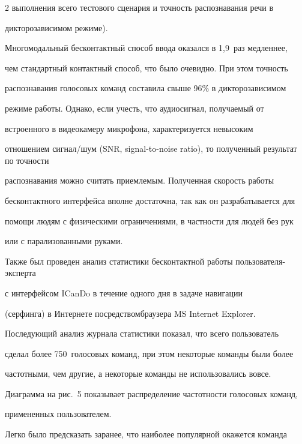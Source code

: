 \begin{multicols}{2}
выполнения всего тестового сценария и точность распознавания речи в 


дикторозависимом режиме). 


    





  Многомодальный бесконтактный способ ввода оказался в 1,9~раз медленнее, 


чем стандартный контактный способ, что было очевидно. При этом точность 


распознавания голосовых команд составила свыше 96\% в дикторозависимом 


режиме работы. Однако, если учесть, что аудиосигнал, по\-лу\-ча\-емый от 


встроенного в видеокамеру микрофона, характеризуется невысоким 


отношением сигнал/шум (SNR, signal-to-noise ratio), то полученный результат по точности 


распознавания можно считать приемлемым. Полученная скорость работы 


бесконтактного интерфейса вполне достаточна, так как он разрабатывается для 


помощи людям с физическими ограничениями, в частности для людей без рук 


или с парализованными руками. 


  


  Также был проведен анализ статистики бес\-контактной работы пользователя-эксперта 


  с ин\-тер\-фейсом ICanDo в течение одного дня в задаче навигации 


(серфинга) в Интернете посредством\linebreak браузера MS Internet Explorer. 


Последующий анализ журнала статистики показал, что всего пользователь 


сделал более 750~голосовых команд, при этом некоторые команды были более 


частотными, чем другие, а некоторые команды не использовались вовсе. 


Диаграмма на рис.~5 показывает распределение частотности голосовых команд, 


примененных пользователем. 








  Легко было предсказать заранее, что наиболее популярной окажется команда 



\end{multicols}
